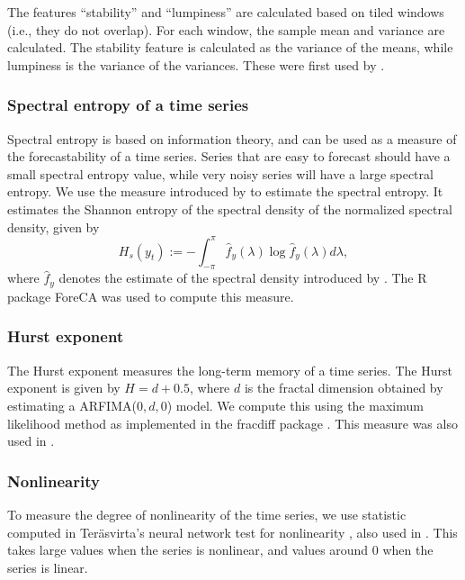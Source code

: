 \documentclass[11pt,a4paper,]{article}
\theoremstyle{definition}
\theoremstyle{definition}
\theoremstyle{definition}
\theoremstyle{remark}
\begin{document}
The features ``stability'' and ``lumpiness'' are calculated based on
tiled windows (i.e., they do not overlap). For each window, the sample
mean and variance are calculated. The stability feature is calculated as
the variance of the means, while lumpiness is the variance of the
variances. These were first used by \textcite{hyndman2015large}.

\subsubsection*{Spectral entropy of a time
series}\label{spectral-entropy-of-a-time-series}

Spectral entropy is based on information theory, and can be used as a
measure of the forecastability of a time series. Series that are easy to
forecast should have a small spectral entropy value, while very noisy
series will have a large spectral entropy. We use the measure introduced
by \textcite{goerg2013forecastable} to estimate the spectral entropy. It
estimates the Shannon entropy of the spectral density of the normalized
spectral density, given by \[ 
  H_{s}(y_t):=-\int_{-\pi}^{\pi}\hat f_y(\lambda)\log \hat f_y({\lambda})d\lambda,
\] where \(\hat{f}_y\) denotes the estimate of the spectral density
introduced by \textcite{nuttall1982spectral}. The R package ForeCA
\autocite{Foreca} was used to compute this measure.

\subsubsection*{Hurst exponent}\label{hurst-exponent}

The Hurst exponent measures the long-term memory of a time series. The
Hurst exponent is given by \(H=d+0.5\), where \(d\) is the fractal
dimension obtained by estimating a ARFIMA(\(0, d, 0\)) model. We compute
this using the maximum likelihood method \autocite{haslett1989space} as
implemented in the fracdiff package \autocite{fracdiff}. This measure
was also used in \textcite{wang2009rule}.

\subsubsection*{Nonlinearity}\label{nonlinearity}

To measure the degree of nonlinearity of the time series, we use
statistic computed in Teräsvirta's neural network test for nonlinearity
\autocite{nonlintest}, also used in \textcite{wang2009rule}. This takes
large values when the series is nonlinear, and values around 0 when the
series is linear.
\end{document}
